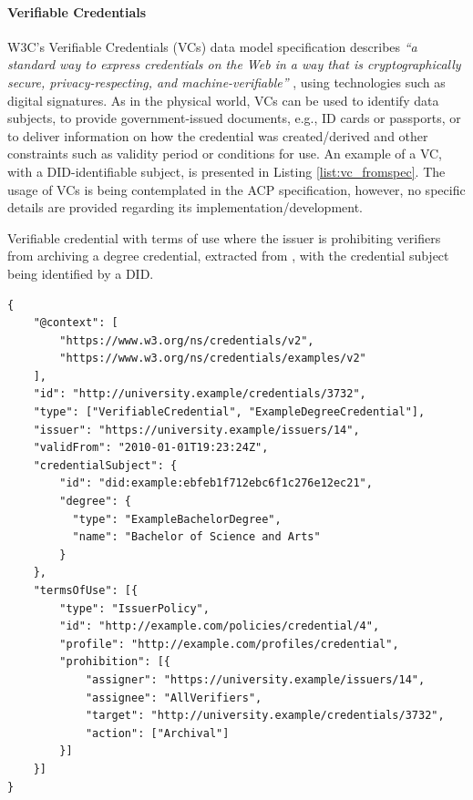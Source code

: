\paragraph{Verifiable Credentials}
W3C's Verifiable Credentials (VCs) data model specification describes \textit{``a standard way to express credentials on the Web in a way that is cryptographically secure, privacy-respecting, and machine-verifiable''} \citep{sporny_verifiable_2023}, using technologies such as digital signatures. As in the physical world, VCs can be used to identify data subjects, to provide government-issued documents, e.g., ID cards or passports, or to deliver information on how the credential was created/derived and other constraints such as validity period or conditions for use. An example of a VC, with a DID-identifiable subject, is presented in Listing \ref{list:vc_fromspec}. The usage of VCs is being contemplated in the ACP specification, however, no specific details are provided regarding its implementation/development.

\begin{listing}[htbp]
\caption[Verifiable credential with terms of use, extracted from \cite{sporny_verifiable_2023}.]{Verifiable credential with terms of use where the issuer is prohibiting verifiers from archiving a degree credential, extracted from \cite{sporny_verifiable_2023}, with the credential subject being identified by a DID.}
\label{list:vc_fromspec}
\begin{verbatim}
{
    "@context": [
        "https://www.w3.org/ns/credentials/v2",
        "https://www.w3.org/ns/credentials/examples/v2"
    ],
    "id": "http://university.example/credentials/3732",
    "type": ["VerifiableCredential", "ExampleDegreeCredential"],
    "issuer": "https://university.example/issuers/14",
    "validFrom": "2010-01-01T19:23:24Z",
    "credentialSubject": {
        "id": "did:example:ebfeb1f712ebc6f1c276e12ec21",
        "degree": {
          "type": "ExampleBachelorDegree",
          "name": "Bachelor of Science and Arts"
        }
    },
    "termsOfUse": [{
        "type": "IssuerPolicy",
        "id": "http://example.com/policies/credential/4",
        "profile": "http://example.com/profiles/credential",
        "prohibition": [{
            "assigner": "https://university.example/issuers/14",
            "assignee": "AllVerifiers",
            "target": "http://university.example/credentials/3732",
            "action": ["Archival"]
        }]
    }] 
}
\end{verbatim}
\end{listing}

